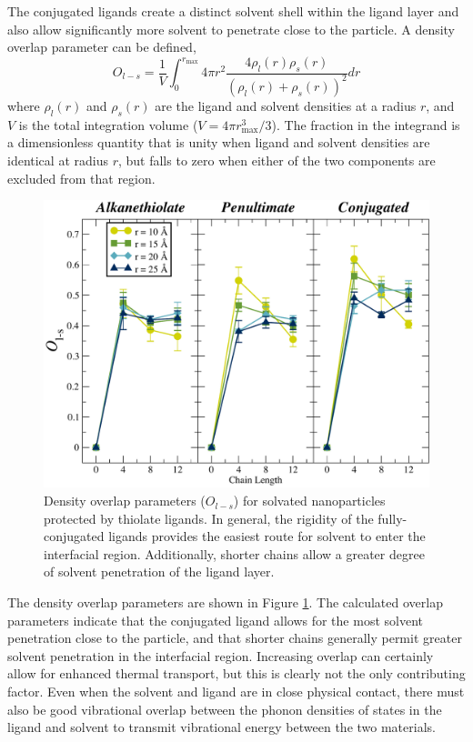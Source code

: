 The conjugated ligands create a distinct solvent shell within the
ligand layer and also allow significantly more solvent to penetrate
close to the particle. A density overlap parameter can be defined,
\begin{equation}
O_{l-s} = \frac{1}{V} \int_0^{r_\mathrm{max}} 4 \pi r^2 \frac{4 \rho_l(r) \rho_s(r)}{\left(\rho_l(r) +
    \rho_s(r)\right)^2} dr
\end{equation}
where $\rho_l(r)$ and $\rho_s(r)$ are the ligand and solvent densities
at a radius $r$, and $V$ is the total integration volume
($V = 4\pi r_\mathrm{max}^3 / 3$).  The fraction in the integrand is a
dimensionless quantity that is unity when ligand and solvent densities
are identical at radius $r$, but falls to zero when either of the two
components are excluded from that region.

\begin{figure}
  \includegraphics[width=\linewidth]{figures/rho3}
  \caption{Density overlap parameters ($O_{l-s}$) for solvated
    nanoparticles protected by thiolate ligands. In general, the
    rigidity of the fully-conjugated ligands provides the easiest
    route for solvent to enter the interfacial region. Additionally,
    shorter chains allow a greater degree of solvent penetration of
    the ligand layer.}
  \label{fig:rho3}
\end{figure}

The density overlap parameters are shown in Figure \ref{fig:rho3}.  The
calculated overlap parameters indicate that the conjugated ligand
allows for the most solvent penetration close to the particle, and
that shorter chains generally permit greater solvent penetration in
the interfacial region. Increasing overlap can certainly allow for
enhanced thermal transport, but this is clearly not the only
contributing factor. Even when the solvent and ligand are in close
physical contact, there must also be good vibrational overlap between
the phonon densities of states in the ligand and solvent to transmit
vibrational energy between the two materials.


